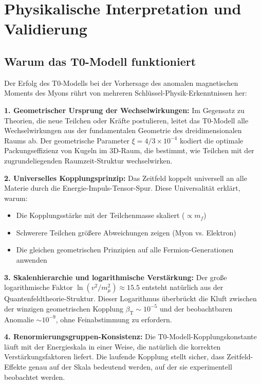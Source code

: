 \documentclass[12pt,a4paper]{article}
\newcommand{\betaT}{\beta_{\text{T}}}
\newcommand{\xigeom}{\xi}
\begin{document}
\section{Physikalische Interpretation und Validierung}

\subsection{Warum das T0-Modell funktioniert}

Der Erfolg des T0-Modells bei der Vorhersage des anomalen magnetischen Moments des Myons rührt von mehreren Schlüssel-Physik-Erkenntnissen her:

\textbf{1. Geometrischer Ursprung der Wechselwirkungen:}
Im Gegensatz zu Theorien, die neue Teilchen oder Kräfte postulieren, leitet das T0-Modell alle Wechselwirkungen aus der fundamentalen Geometrie des dreidimensionalen Raums ab. Der geometrische Parameter $\xigeom = 4/3 \times 10^{-4}$ kodiert die optimale Packungseffizienz von Kugeln im 3D-Raum, die bestimmt, wie Teilchen mit der zugrundeliegenden Raumzeit-Struktur wechselwirken.

\textbf{2. Universelles Kopplungsprinzip:}
Das Zeitfeld koppelt universell an alle Materie durch die Energie-Impuls-Tensor-Spur. Diese Universalität erklärt, warum:
\begin{itemize}
\item Die Kopplungsstärke mit der Teilchenmasse skaliert ($\propto m_f$)
\item Schwerere Teilchen größere Abweichungen zeigen (Myon vs. Elektron)
\item Die gleichen geometrischen Prinzipien auf alle Fermion-Generationen anwenden
\end{itemize}

\textbf{3. Skalenhierarchie und logarithmische Verstärkung:}
Der große logarithmische Faktor $\ln(v^2/m_\mu^2) \approx 15.5$ entsteht natürlich aus der Quantenfeldtheorie-Struktur. Dieser Logarithmus überbrückt die Kluft zwischen der winzigen geometrischen Kopplung $\betaT \sim 10^{-5}$ und der beobachtbaren Anomalie $\sim 10^{-9}$, ohne Feinabstimmung zu erfordern.

\textbf{4. Renormierungsgruppen-Konsistenz:}
Die T0-Modell-Kopplungskonstante läuft mit der Energieskala in einer Weise, die natürlich die korrekten Verstärkungsfaktoren liefert. Die laufende Kopplung stellt sicher, dass Zeitfeld-Effekte genau auf der Skala bedeutend werden, auf der sie experimentell beobachtet werden.
\end{document}
